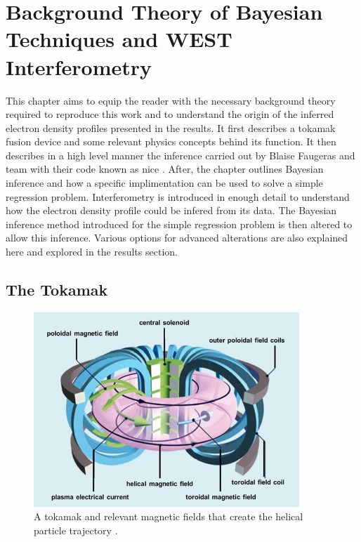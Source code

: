 \chapter{Background Theory of Bayesian Techniques and WEST Interferometry}

This chapter aims to equip the reader with the necessary background theory required to reproduce this work and to understand the origin of the inferred electron density profiles presented in the results. It first describes a tokamak fusion device and some relevant physics concepts behind its function. It then describes in a high level manner the inference carried out by Blaise Faugeras and team with their code known as \gls{nice} \cite{nice}. After, the chapter outlines Bayesian inference and how a specific implimentation can be used to solve a simple regression problem. Interferometry is introduced in enough detail to understand how the electron density profile could be infered from its data. The Bayesian inference method introduced for the simple regression problem is then altered to allow this inference. Various options for advanced alterations are also explained here and explored in the results section.

\section{The Tokamak}

\begin{figure}[H]
  \centering
  \includegraphics[width=10cm]{images/tokamak.jpg}
  \caption{A tokamak and relevant magnetic fields that create the helical particle trajectory \cite{tokamakSchema}.}
  \label{fig:tokamakSchema}
\end{figure}

